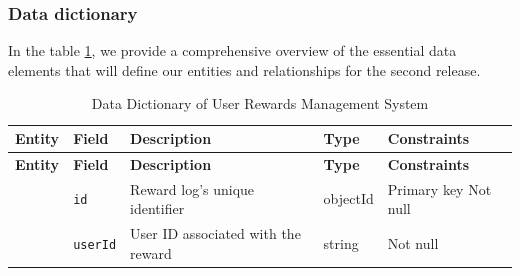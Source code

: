 \subsubsection{Data dictionary}
In the table \ref{tab-r2dd}, we provide a comprehensive overview of the essential data elements
that will define our entities and relationships for the second release.


%         
\begin{landscape}
    \begin{longtable}{ | m{} | m{} | m{} | m{} | m{} | }
        \caption{Data Dictionary of User Rewards Management System}   \label{tab-r2dd}                                                                                                                                                                  \\
        \hline
        \textbf{Entity}                                                  & \textbf{Field}                            & \textbf{Description}                                                 & \textbf{Type} & \textbf{Constraints}          \\
        \hline
        \endfirsthead
        \hline
        \textbf{Entity}                                                  & \textbf{Field}                            & \textbf{Description}                                                 & \textbf{Type} & \textbf{Constraints}          \\
        \hline
        \endhead
        \hline
        \endfoot
        \endlastfoot
        \multirow[t]{8}{5em}{\textbf{RewardLog}}                         & \texttt{id}                               & Reward log's unique identifier                                       & objectId      & Primary key \newline Not null \\
        \cline{2-5}
                                                                         & \texttt{userId}                           & User ID associated with the reward                                   & string        & Not null                      \\

\end{longtable}
\end{landscape}
